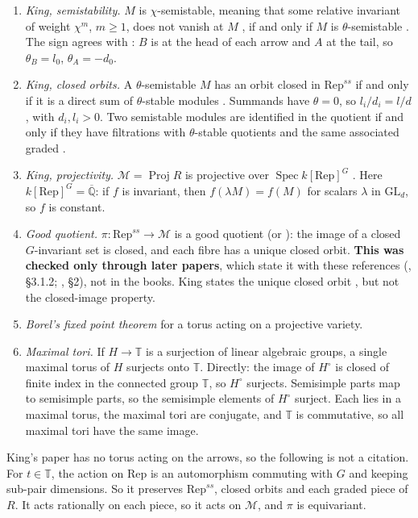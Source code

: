 \documentclass[11pt,a4paper]{article}
\theoremstyle{plain}
\theoremstyle{definition}
\newcommand{\Qbar}{\overline{\mathbb{Q}}}
\newcommand{\Tor}{\mathbb{T}}
\newcommand{\Rep}{\mathrm{Rep}}
\newcommand{\Mm}{\mathcal{M}}
\newcommand{\Proj}{\operatorname{Proj}}
\newcommand{\GL}{\mathrm{GL}}
\begin{document}
\begin{enumerate}[label=(F\arabic*)]
\item \emph{King, semistability.} $M$ is $\chi$-semistable, meaning that some relative invariant of weight $\chi^{m}$, $m\ge1$, does not vanish at $M$
\cite[Def.~2.1(i), p.~517]{Kin94}, if and only if $M$ is $\theta$-semistable \cite[Prop.~3.1, p.~521]{Kin94}. The sign agrees with
\cite[Def.~1.1, p.~516; pp.~517, 520]{Kin94}: $B$ is at the head of each arrow and $A$ at the tail, so $\theta_{B}=l_{0}$, $\theta_{A}=-d_{0}$.
\item \emph{King, closed orbits.} A $\theta$-semistable $M$ has an orbit closed in $\Rep^{ss}$ if and only if it is a direct sum of $\theta$-stable modules
\cite[Prop.~3.2(i), p.~522]{Kin94}. Summands have $\theta=0$, so $l_{i}/d_{i}=l/d$, with $d_{i},l_{i}>0$. Two semistable modules are identified in the quotient if and only if they have
filtrations with $\theta$-stable quotients and the same associated graded \cite[Prop.~3.2(ii)]{Kin94}.
\item \emph{King, projectivity.} $\Mm=\Proj R$ is projective over $\operatorname{Spec}k[\Rep]^{G}$ \cite[p.~518]{Kin94}. Here $k[\Rep]^{G}=\Qbar$: if $f$ is invariant, then
$f(\lambda M)=f(M)$ for scalars $\lambda$ in $\GL_{d}$, so $f$ is constant.
\item \emph{Good quotient.} $\pi:\Rep^{ss}\to\Mm$ is a good quotient \cite[Th.~1.10]{MFK} (or \cite[Th.~3.21]{New}): the image of a closed $G$-invariant set is closed, and each fibre has a unique
closed orbit. \textbf{This was checked only through later papers}, which state it with these references (\cite{Ar15}, \S3.1.2; \cite{Ar23}, \S2), not in the books.
King states the unique closed orbit \cite[p.~518]{Kin94}, but not the closed-image property.
\item \emph{Borel's fixed point theorem} for a torus acting on a projective variety.
\item \emph{Maximal tori.} If $H\to\Tor$ is a surjection of linear algebraic groups, a single maximal torus of $H$ surjects onto $\Tor$. Directly: the image of $H^{\circ}$ is closed of
finite index in the connected group $\Tor$, so $H^{\circ}$ surjects. Semisimple parts map to semisimple parts, so the semisimple elements of $H^{\circ}$ surject. Each lies in a maximal torus,
the maximal tori are conjugate, and $\Tor$ is commutative, so all maximal tori have the same image.
\end{enumerate}

King's paper has no torus acting on the arrows, so the following is not a citation. For $t\in\Tor$, the action on $\Rep$ is an automorphism commuting with $G$ and keeping
sub-pair dimensions. So it preserves $\Rep^{ss}$, closed orbits and each graded piece of $R$. It acts rationally on each piece, so it acts on $\Mm$, and $\pi$ is equivariant.
\end{document}
